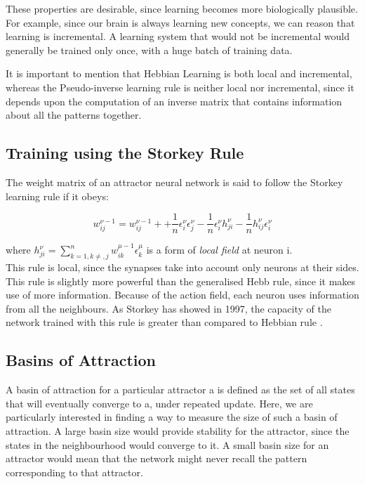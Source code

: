 These properties are desirable, since learning becomes more biologically plausible. For example, since our brain is always learning new concepts, we can reason that learning is incremental. A learning system that would not be incremental would generally be trained only once, with a huge batch of training data.

It is important to mention that Hebbian Learning is both local and incremental, whereas the Pseudo-inverse learning rule is neither local nor incremental, since it depends upon the computation of an inverse matrix that contains information about all the patterns together.

\subsection{Training using the Storkey Rule}

The weight matrix of an attractor neural network is said to follow the Storkey learning rule if it obeys:

\[ w_{ij}^{\nu-1} = w_{ij}^{\nu-1}+
		    +\frac{1}{n}\epsilon_{i}^{\nu} \epsilon_{j}^{\nu} 
		    -\frac{1}{n}\epsilon_{i}^{\nu} h_{ji}^{\nu}
		    -\frac{1}{n}h_{ij}^{\nu} \epsilon_{i}^{\nu}
		    \]

where \( h_{ji}^{\nu} = \sum_{k=1,k\neq,j}^{n} w_{ik}^{\mu-1}\epsilon_{k}^{\mu} \) is a form of \emph{local field} \cite{storkey1997increasing} at neuron i.\\ 
		    
This rule is local, since the synapses take into account only neurons at their sides. This rule is slightly more powerful than the generalised Hebb rule, since it makes use of more information. Because of the action field, each neuron uses information from all the neighbours. As Storkey has showed in 1997, the capacity of the network trained with this rule is greater than compared to Hebbian rule \cite{storkey1997increasing}.


\subsection{Basins of Attraction}
A basin of attraction for a particular attractor a is defined as the set of all states that will eventually converge to a, under repeated update. Here, we are particularly interested in finding a way to measure the size of such a basin of attraction. A large basin size would provide stability for the attractor, since the states in the neighbourhood would converge to it. A small basin size for an attractor would mean that the network might never recall the pattern corresponding to that attractor.

